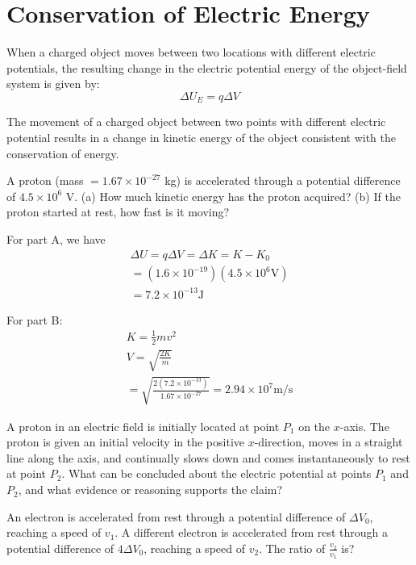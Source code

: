 \documentclass[../em.tex]{subfiles}
\begin{document}
\section{Conservation of Electric Energy}
When a charged object moves between two locations with different electric potentials, the resulting change in the electric potential energy
of the object-field system is given by:
\[\Delta U_E=q\Delta V\]

The movement of a charged object between two points with different electric potential results in a change in kinetic
energy of the object consistent with the conservation of energy.

\begin{example}
    A proton (mass $=1.67\times10^{-27}$ kg) is accelerated through a potential difference of $4.5\times10^6$ V.
    (a) How much kinetic energy has the proton acquired? (b) If the proton started at rest, how fast is it moving?

    For part A, we have
    \begin{align*}
    \Delta U = q\Delta V = \Delta K = K-K_0 \\
    = (1.6\times10^{-19})(4.5\times10^6\text{V})\\
    = 7.2\times10^{-13}\text{J}
    \end{align*}

    For part B:
    \begin{align*}
        K = \frac{1}{2}mv^2\\
        V = \sqrt{\frac{2K}{m}}\\
        = \sqrt{\frac{2(7.2\times10^{-13})}{1.67\times10^{-27}}}=2.94\times10^7\text{m/s}
    \end{align*}
    
\end{example}
\ex A proton in an electric field is initially located at point $P_1$ on the $x$-axis. The proton is given an initial velocity in the positive $x$-direction, moves in a straight line along the axis, and 
continually slows down and comes instantaneously to rest at point $P_2$. What can be concluded about the electric potential at points $P_1$ and $P_2$, and what evidence or reasoning supports the claim?

\ex An electron is accelerated from rest through a potential difference of $\Delta V_0$, reaching a speed of $v_1$. A different electron is accelerated from rest through a potential difference of $4\Delta V_0$, reaching a speed of $v_2$. The ratio of $\frac{v_2}{v_1}$ is?
\end{document}
